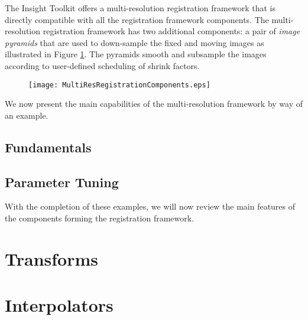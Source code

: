 The Insight Toolkit offers a multi-resolution registration framework that is
directly compatible with all the registration framework components. The
multi-resolution registration framework has two additional components: a pair
of \emph{image pyramids} that are used to down-sample the fixed and moving
images as illustrated in Figure \ref{fig:MultiResRegistrationComponents}.
The pyramids smooth and subsample the images according to user-defined
scheduling of shrink factors.
 
\begin{figure}
\center
\texttt{[image: MultiResRegistrationComponents.eps]}
\label{fig:MultiResRegistrationComponents}
\end{figure}
 
We now present the main capabilities of the multi-resolution framework by
way of an example.

\subsection{Fundamentals}
\ifitkFullVersion

\fi

\subsection{Parameter Tuning}
\ifitkFullVersion

\fi

With the completion of these examples, we will now review the main
features of the components forming the registration framework.


\clearpage

\section{Transforms}
\label{sec:Transforms}
\ifitkFullVersion

\fi



\clearpage

\section{Interpolators}
\label{sec:Interpolators}
\ifitkFullVersion

\fi

